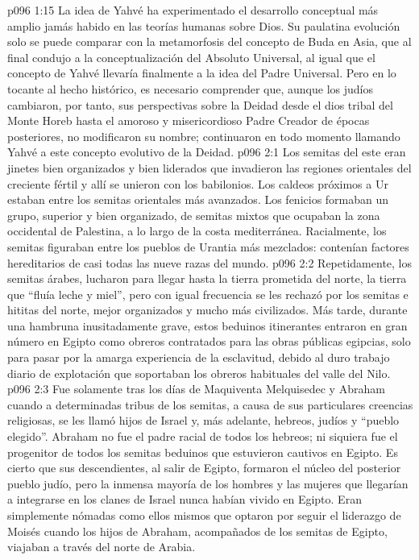 \vs p096 1:15 La idea de Yahvé ha experimentado el desarrollo conceptual más amplio jamás habido en las teorías humanas sobre Dios. Su paulatina evolución solo se puede comparar con la metamorfosis del concepto de Buda en Asia, que al final condujo a la conceptualización del Absoluto Universal, al igual que el concepto de Yahvé llevaría finalmente a la idea del Padre Universal. Pero en lo tocante al hecho histórico, es necesario comprender que, aunque los judíos cambiaron, por tanto, sus perspectivas sobre la Deidad desde el dios tribal del Monte Horeb hasta el amoroso y misericordioso Padre Creador de épocas posteriores, no modificaron su nombre; continuaron en todo momento llamando Yahvé a este concepto evolutivo de la Deidad.
\vs p096 2:1 Los semitas del este eran jinetes bien organizados y bien liderados que invadieron las regiones orientales del creciente fértil y allí se unieron con los babilonios. Los caldeos próximos a Ur estaban entre los semitas orientales más avanzados. Los fenicios formaban un grupo, superior y bien organizado, de semitas mixtos que ocupaban la zona occidental de Palestina, a lo largo de la costa mediterránea. Racialmente, los semitas figuraban entre los pueblos de Urantia más mezclados: contenían factores hereditarios de casi todas las nueve razas del mundo.
\vs p096 2:2 Repetidamente, los semitas árabes, lucharon para llegar hasta la tierra prometida del norte, la tierra que “fluía leche y miel”, pero con igual frecuencia se les rechazó por los semitas e hititas del norte, mejor organizados y mucho más civilizados. Más tarde, durante una hambruna inusitadamente grave, estos beduinos itinerantes entraron en gran número en Egipto como obreros contratados para las obras públicas egipcias, solo para pasar por la amarga experiencia de la esclavitud, debido al duro trabajo diario de explotación que soportaban los obreros habituales del valle del Nilo.
\vs p096 2:3 Fue solamente tras los días de Maquiventa Melquisedec y Abraham cuando a determinadas tribus de los semitas, a causa de sus particulares creencias religiosas, se les llamó hijos de Israel y, más adelante, hebreos, judíos y “pueblo elegido”. Abraham no fue el padre racial de todos los hebreos; ni siquiera fue el progenitor de todos los semitas beduinos que estuvieron cautivos en Egipto. Es cierto que sus descendientes, al salir de Egipto, formaron el núcleo del posterior pueblo judío, pero la inmensa mayoría de los hombres y las mujeres que llegarían a integrarse en los clanes de Israel nunca habían vivido en Egipto. Eran simplemente nómadas como ellos mismos que optaron por seguir el liderazgo de Moisés cuando los hijos de Abraham, acompañados de los semitas de Egipto, viajaban a través del norte de Arabia.
